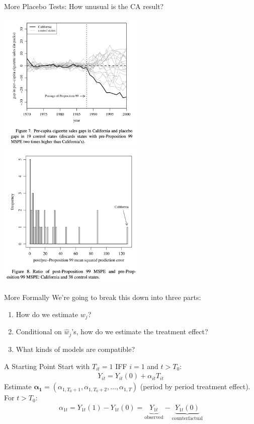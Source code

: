 \documentclass[xcolor=pdftex,dvipsnames,table,mathserif,aspectratio=169]{beamer}
\begin{document}
\begin{frame}{More Placebo Tests: How unusual is the CA result?}
\begin{center}
\includegraphics[width=2.75in]{./resources/abadie_6.png}
\includegraphics[width=2.75in]{./resources/abadie_7.png}
\end{center}
\end{frame}


\begin{frame}{More Formally}
We're going to break this down into three parts:
\begin{enumerate}
\item How do we estimate $w_j$?
\item Conditional on $\hat{w}_j$'s, how do we estimate the treatment effect?
\item What kinds of models are compatible?
\end{enumerate}
\end{frame}


\begin{frame}{A Starting Point}
Start with $T_{it} =1$ IFF $i =1$ and $t > T_0$:
\begin{align*}
Y_{it} = Y_{it}(0)  + \alpha_{it} T_{it}
\end{align*}
Estimate $\mathbf{\boldsymbol{\alpha}_1} =(\alpha_{1, T_0+1},\alpha_{1, T_0+2},\ldots,\alpha_{1,T}) $ (period by period treatment effect).\\
 For $t > T_0$:
\begin{align*}
\alpha_{1 t}=Y_{1 t}(1)-Y_{1 t}(0)=\underbrace{Y_{1 t}}_{\text{observed}}-\underbrace{Y_{1 t}(0)}_{\text{counterfactual}}
\end{align*}

\end{frame}
\end{document}
